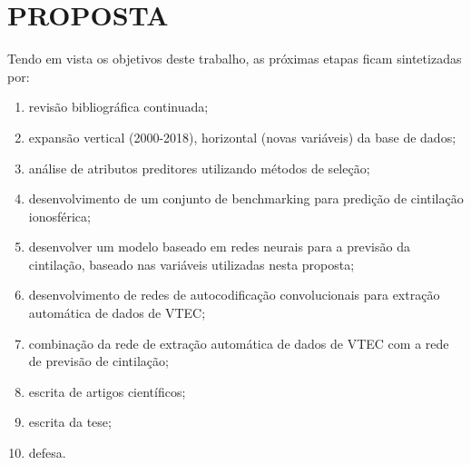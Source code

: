 \chapter{PROPOSTA}

Tendo em vista os objetivos deste trabalho, as próximas etapas ficam sintetizadas por:

\begin{enumerate}
\item revisão bibliográfica continuada;
\item expansão vertical (2000-2018), horizontal (novas variáveis) da base de dados;
\item análise de atributos preditores utilizando métodos de seleção;
\item desenvolvimento de um conjunto de benchmarking para predição de cintilação ionosférica;
\item desenvolver um modelo baseado em redes neurais para a previsão da cintilação, baseado nas variáveis utilizadas nesta proposta;
\item desenvolvimento de redes de autocodificação convolucionais para extração automática de dados de VTEC;
\item combinação da rede de extração automática de dados de VTEC com a rede de previsão de cintilação;
\item escrita de artigos científicos;
\item escrita da tese;
\item defesa.

\end{enumerate}
